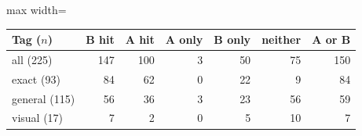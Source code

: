 \begin{adjustbox}{max width=\linewidth}
\begin{tabular}{lrrrrrr}
\toprule
Tag ($n$) & B hit & A hit & A only & B only & neither & A or B \\
\midrule
all (225) & 147 & 100 & 3 & 50 & 75 & 150 \\
exact (93) & 84 & 62 & 0 & 22 & 9 & 84 \\
general (115) & 56 & 36 & 3 & 23 & 56 & 59 \\
visual (17) & 7 & 2 & 0 & 5 & 10 & 7 \\
\bottomrule
\end{tabular}
\end{adjustbox}
\par{}
